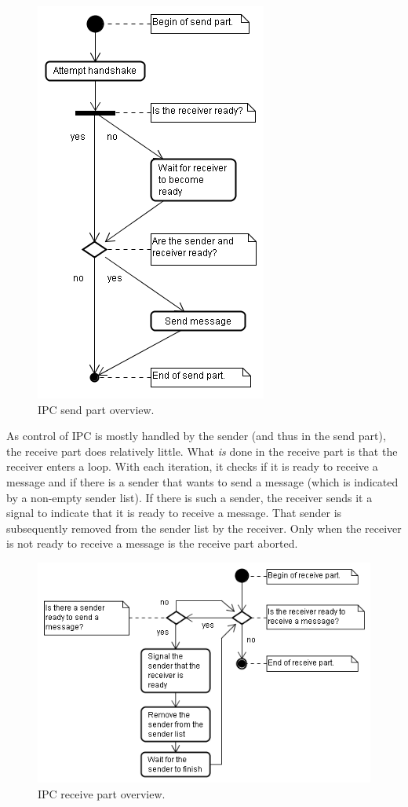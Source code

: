\begin{figure}[!ht]
\includegraphics[scale=0.50]{images/diagrams/ipc_activity_send_part}
\caption{IPC send part overview.}
\end{figure}

As control of IPC is mostly handled by the sender (and thus in the send part), the receive part does relatively little. What \textit{is} done in the receive part is that the receiver enters a loop. With each iteration, it checks if it is ready to receive a message and if there is a sender that wants to send a message (which is indicated by a non-empty sender list). If there is such a sender, the receiver sends it a signal to indicate that it is ready to receive a message. That sender is subsequently removed from the sender list by the receiver. Only when the receiver is not ready to receive a message is the receive part aborted.

\begin{figure}[!ht]
\includegraphics[scale=0.50]{images/diagrams/ipc_activity_receive_part}
\caption{IPC receive part overview.}
\end{figure}

